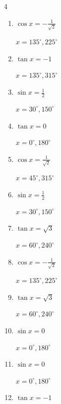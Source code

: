 \begin{multicols}{4}
\begin{enumerate}
        $\displaystyle x = 225^{\circ} , 315^{\circ}$

  \item $\displaystyle \cos{x}  = -\frac{1}{\sqrt{2}}$

        $\displaystyle x = 135^{\circ} , 225^{\circ}$

\columnbreak %

  \item $\displaystyle \tan{x}  = -1$

        $\displaystyle x = 135^{\circ} , 315^{\circ}$

  \item $\displaystyle \sin{x}  = \frac{1}{2}$

        $\displaystyle x = 30^{\circ} , 150^{\circ}$

  \item $\displaystyle \tan{x}  = 0$

        $\displaystyle x = 0^{\circ} , 180^{\circ}$

  \item $\displaystyle \cos{x}  = \frac{1}{\sqrt{2}}$

        $\displaystyle x = 45^{\circ} , 315^{\circ}$

  \item $\displaystyle \sin{x}  = \frac{1}{2}$

        $\displaystyle x = 30^{\circ} , 150^{\circ}$

  \item $\displaystyle \tan{x}  = \sqrt{3}$

        $\displaystyle x = 60^{\circ} , 240^{\circ}$

  \item $\displaystyle \cos{x}  = -\frac{1}{\sqrt{2}}$

        $\displaystyle x = 135^{\circ} , 225^{\circ}$

  \item $\displaystyle \tan{x}  = \sqrt{3}$

        $\displaystyle x = 60^{\circ} , 240^{\circ}$

  \item $\displaystyle \sin{x}  = 0$

        $\displaystyle x = 0^{\circ} , 180^{\circ}$

  \item $\displaystyle \sin{x}  = 0$

        $\displaystyle x = 0^{\circ} , 180^{\circ}$

  \item $\displaystyle \tan{x}  = -1$


\end{enumerate}
\end{multicols}
